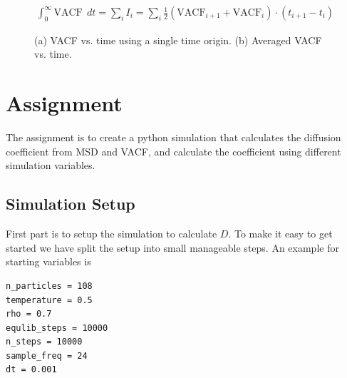 \documentclass{article}
\begin{document}
\begin{align}
    \int_0^\infty \mathrm{VACF} \ \ dt = \sum_i I_i = \sum_i \frac{1}{2}(\mathrm{VACF}_{i+1} 
    + \mathrm{VACF}_i) \cdot (t_{i+1} - t_i)
\end{align}



\begin{figure}[htb]
	\centering
  \caption{
    (a) VACF vs. time using a single time origin.
    (b) Averaged VACF vs. time.
  }
\end{figure}



\newpage
\section{Assignment}

The assignment is to create a python simulation that calculates 
the diffusion coefficient from MSD and VACF, and calculate 
the coefficient using different simulation variables.

\subsection{Simulation Setup}

First part is to setup the simulation to calculate $D$.
To make it easy to get started we have split the setup into
small manageable steps. An example for starting variables is

\begin{lstlisting}
n_particles = 108
temperature = 0.5
rho = 0.7
equlib_steps = 10000
n_steps = 10000
sample_freq = 24
dt = 0.001
\end{lstlisting}
\end{document}
